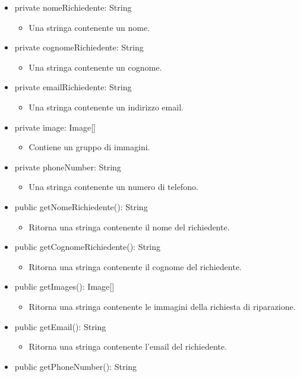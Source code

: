 \documentclass{report}
\begin{document}
\begin{itemize}
\item private nomeRichiedente: String
\begin{itemize}
	\item Una stringa contenente un nome.
\end{itemize}
\item private cognomeRichiedente: String
\begin{itemize}
	\item Una stringa contenente un cognome.
\end{itemize}
\item private emailRichiedente: String
\begin{itemize}
	\item Una stringa contenente un indirizzo email.
\end{itemize}
\item private image: Image[]
\begin{itemize}
	\item Contiene un gruppo di immagini.
\end{itemize}
\item private phoneNumber: String
\begin{itemize}
	\item Una stringa contenente un numero di telefono.
\end{itemize}
\item public getNomeRichiedente(): String
\begin{itemize}
	\item Ritorna una stringa contenente il nome del richiedente.
\end{itemize}
\item public getCognomeRichiedente(): String
\begin{itemize}
	\item Ritorna una stringa contenente il cognome del richiedente.
\end{itemize}
\item public getImages(): Image[]
\begin{itemize}
	\item Ritorna una stringa contenente le immagini della richiesta di riparazione.
\end{itemize}
\item public getEmail(): String
\begin{itemize}
	\item Ritorna una stringa contenente l'email del richiedente.
\end{itemize}
\item public getPhoneNumber(): String

\end{itemize}
\end{document}
